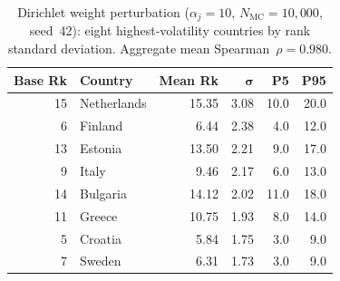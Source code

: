 \begin{table}[htbp]
\centering
\caption{Dirichlet weight perturbation ($\alpha_j=10$, $N_{\text{MC}}=10{,}000$, seed~42): eight highest-volatility countries by rank standard deviation.  Aggregate mean Spearman~$\rho = 0.980$.}
\label{tab:dirichlet-top}
\begin{tabular}{@{}r l rrrr@{}}
\toprule
\textbf{Base Rk} & \textbf{Country} & \textbf{Mean Rk} & $\boldsymbol{\sigma}$ & \textbf{P5} & \textbf{P95} \\
\midrule
  15 & Netherlands & 15.35 & 3.08 & 10.0 & 20.0 \\
  6 & Finland & 6.44 & 2.38 & 4.0 & 12.0 \\
  13 & Estonia & 13.50 & 2.21 & 9.0 & 17.0 \\
  9 & Italy & 9.46 & 2.17 & 6.0 & 13.0 \\
  14 & Bulgaria & 14.12 & 2.02 & 11.0 & 18.0 \\
  11 & Greece & 10.75 & 1.93 & 8.0 & 14.0 \\
  5 & Croatia & 5.84 & 1.75 & 3.0 & 9.0 \\
  7 & Sweden & 6.31 & 1.73 & 3.0 & 9.0 \\
\bottomrule
\end{tabular}
\end{table}